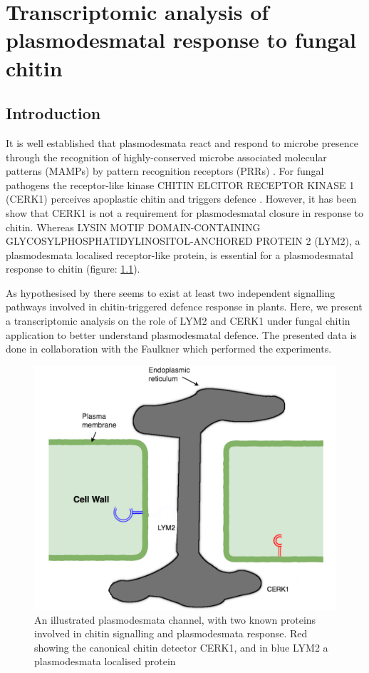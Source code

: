 \documentclass[../main.tex]{subfiles}
\begin{document}
\chapter{Transcriptomic analysis of plasmodesmatal response to fungal chitin}
\label{cha:transcripts}

\section{Introduction}
It is well established that plasmodesmata react and respond to microbe presence
through the recognition of highly-conserved microbe associated molecular
patterns (MAMPs) by pattern recognition receptors (PRRs)
\cite{zipfelPlantPatternrecognitionReceptors2014a,
  chevalPlasmodesmalRegulationPlant2018}. For fungal pathogens the receptor-like
kinase CHITIN ELCITOR RECEPTOR KINASE 1 (CERK1) perceives apoplastic chitin and
triggers defence \cite{miyaCERK1LysMReceptor2007}.
However, it has been show that CERK1 is not a requirement for plasmodesmatal
closure in response to chitin. Whereas LYSIN MOTIF
DOMAIN-CONTAINING GLYCOSYLPHOSPHATIDYLINOSITOL-ANCHORED PROTEIN 2 (LYM2), a
plasmodesmata localised receptor-like protein, is
essential for a plasmodesmatal response to chitin \cite{Faulkner2013}
(figure: \ref{fig:receptors}).


As hypothesised by \citet{Faulkner2013} there seems to exist at least two
independent signalling pathways involved in chitin-triggered defence response in
plants. Here, we present a transcriptomic analysis on the role of LYM2 and CERK1
under fungal chitin application to better understand plasmodesmatal defence. The
presented data is done in collaboration with the Faulkner which performed the
experiments.


\begin{figure}[ht]
  \centering
  \includegraphics[width=0.5\columnwidth]{figures/original desmotubule.png}
  \caption[Plasmodesmata, \textit{lym2-1} and\textit{cerk2-1}diagram]{\label{fig:receptors}
    An illustrated plasmodesmata channel, with two
    known proteins involved in chitin signalling and plasmodesmata response. Red
    showing the canonical chitin detector CERK1, and in blue LYM2 a
    plasmodesmata localised protein}
\end{figure}
\end{document}
